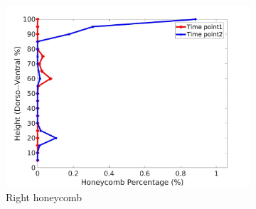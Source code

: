 \begin{figure}[H]
\begin{subfigure}{.42\linewidth}
  \includegraphics[width=\linewidth,trim={{.0\wd0} {.0\wd0} {.0\wd0} {.0\wd0}},clip]{Appendix/Image_AppexA/DorsoToVentral/IPF14RightLungHoneycombDiseaseDorsoToVentral.jpg}
  \caption{Right honeycomb}
  \label{fig:IPF14DiseaseDorsoToVentral-f}
\end{subfigure}
\begin{subfigure}{.42\linewidth}%

\end{subfigure}
\end{figure}
